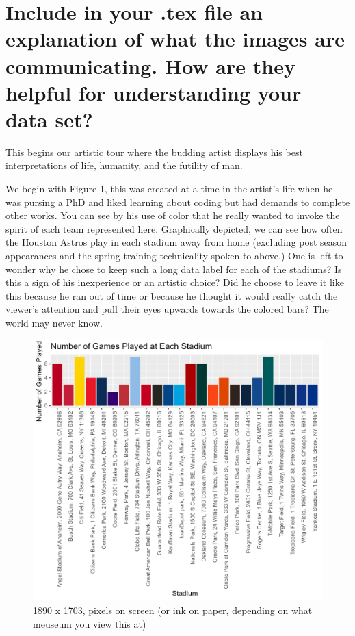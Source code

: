 \documentclass{article}
\begin{document}
\section{Include in your .tex file an explanation of what the images are communicating. How
are they helpful for understanding your data set?
}
This begins our artistic tour where the budding artist displays his best interpretations of life, humanity, and the futility of man.

We begin with Figure 1, this was created at a time in the artist's life when he was pursing a PhD and liked learning about coding but had demands to complete other works. You can see by his use of color that he really wanted to invoke the spirit of each team represented here. Graphically depicted, we can see how often the Houston Astros play in each stadium away from home (excluding post season appearances and the spring training technicality spoken to above.) One is left to wonder why he chose to keep such a long data label for each of the stadiums? Is this a sign of his inexperience or an artistic choice? Did he choose to leave it like this because he ran out of time or because he thought it would really catch the viewer's attention and pull their eyes upwards towards the colored bars? The world may never know.
\begin{figure}
    \centering
    \includegraphics[width=0.5\linewidth]{PS6a_Zilles.png}
    \caption{1890 x 1703, pixels on screen (or ink on paper, depending on what meuseum you view this at)}
    \label{fig:Frequency of Stadiums}
\end{figure}
\end{document}

